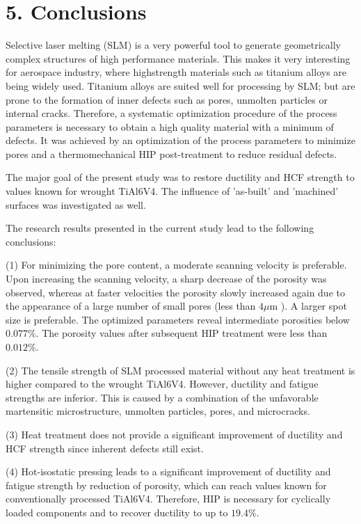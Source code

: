 \documentclass[10pt]{article}
\begin{document}
\section*{5. Conclusions}
Selective laser melting (SLM) is a very powerful tool to generate geometrically complex structures of high performance materials. This makes it very interesting for aerospace industry, where highstrength materials such as titanium alloys are being widely used. Titanium alloys are suited well for processing by SLM; but are prone to the formation of inner defects such as pores, unmolten particles or internal cracks. Therefore, a systematic optimization procedure of the process parameters is necessary to obtain a high quality material with a minimum of defects. It was achieved by an optimization of the process parameters to minimize pores and a thermomechanical HIP post-treatment to reduce residual defects.

The major goal of the present study was to restore ductility and HCF strength to values known for wrought TiAl6V4. The influence of 'as-built' and 'machined' surfaces was investigated as well.

The research results presented in the current study lead to the following conclusions:

(1) For minimizing the pore content, a moderate scanning velocity is preferable. Upon increasing the scanning velocity, a sharp decrease of the porosity was observed, whereas at faster velocities the porosity slowly increased again due to the appearance of a large number of small pores (less than $4 \mu \mathrm{m}$ ). A larger spot size is preferable. The optimized parameters reveal intermediate porosities below $0.077 \%$. The porosity values after subsequent HIP treatment were less than $0.012 \%$.

(2) The tensile strength of SLM processed material without any heat treatment is higher compared to the wrought TiAl6V4. However, ductility and fatigue strengths are inferior. This is caused by a combination of the unfavorable martensitic microstructure, unmolten particles, pores, and microcracks.

(3) Heat treatment does not provide a significant improvement of ductility and HCF strength since inherent defects still exist.

(4) Hot-isostatic pressing leads to a significant improvement of ductility and fatigue strength by reduction of porosity, which can reach values known for conventionally processed TiAl6V4. Therefore, HIP is necessary for cyclically loaded components and to recover ductility to up to $19.4 \%$.
\end{document}
